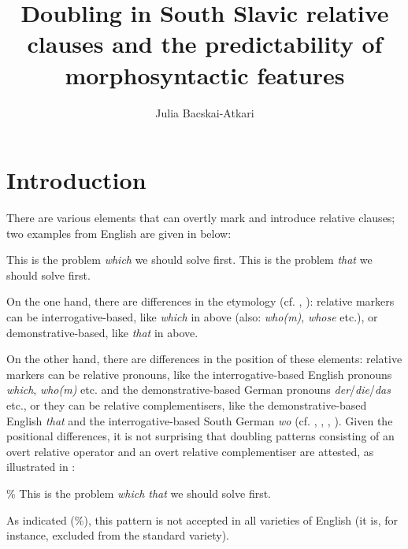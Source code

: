 \documentclass[output=paper]{langscibook}
\author{Julia Bacskai-Atkari\affiliation{University of Amsterdam;University of Potsdam}}
\title[Doubling in South Slavic relative clauses]
      {Doubling in South Slavic relative clauses and the predictability of morphosyntactic features}
\begin{document}

\maketitle


\section{Introduction}
There are various elements that can overtly mark and introduce relative clauses; two examples from English are given in  below:

\ea \label{bacsk:ex:english}
\ea This is the problem \textit{which} we should solve first. \label{bacsk:ex:which}
\ex This is the problem \textit{that} we should solve first. \label{bacsk:ex:that}
\z
\z

\noindent On the one hand, there are differences in the etymology (cf. \citealt{hoppertraugott1993}, \citealt{heinekuteva2002}): relative markers can be interrogative-based, like \textit{which} in  above (also: \textit{who(m)}, \textit{whose} etc.), or demonstrative-based, like \textit{that} in  above.

On the other hand, there are differences in the position of these elements: relative markers can be relative pronouns, like the interrogative-based English pronouns \textit{which}, \textit{who(m)} etc. and the demonstrative-based German pronouns \textit{der}/\textit{die}/\textit{das} etc., or they can be relative complementisers, like the demonstrative-based English \textit{that} and the interrogative-based South German \textit{wo} (cf. \citealt{bayer1984}, \citealt{salzmann2006, salzmann2017}, \citealt{brandnerbraeuning2013}, \citealt{weiss2013}). Given the positional differences, it is not surprising that doubling patterns consisting of an overt relative operator and an overt relative complementiser are attested, as illustrated in :

\ea \% This is the problem \textit{which that} we should solve first. \label{bacsk:ex:englishdoubling}
\z

\noindent As indicated (\%), this pattern is not accepted in all varieties of English (it is, for instance, excluded from the standard variety).
\end{document}
